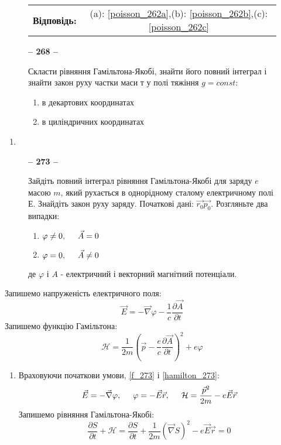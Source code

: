 \documentclass[a4paper,12pt]{article}
\newenvironment{task}[1]{\begin{figure*}[htp]\begin{framed}\begin{center}\textbf{-- {#1} --}\end{center}}{\end{framed}\end{figure*}}
\newenvironment{ans}[0]{\begin{figure*}[htp]\begin{center}\begin{tabular}{lc}\textbf{Відповідь:}\tab&}{\end{tabular}\end{center}\end{figure*}}
\newcommand\partiald[2]{\dfrac{\partial{#1}}{\partial{#2}}}
\newcommand\tab [1][0.5cm]{\hspace*{#1}}
\begin{document}
\begin{justify}
		\begin{ans}
			(a): \cref{poisson_262a},\tab (b): \cref{poisson_262b},\tab (c): \cref{poisson_262c}
		\end{ans}
		\begin{task}{268}
			Скласти рівняння Гамільтона-Якобі, знайти його повний інтеграл і знайти закон руху частки маси т у полі тяжіння $g= const$: 	
			\begin{enumerate}[label=\alph*)]
				\item в декартових координатах
				\item в циліндричних координатах
			\end{enumerate}
		\end{task}
		\begin{enumerate}[label=\alph*)]
			\item 
		\end{enumerate}
		\begin{task}{273}
			Зайдіть повний інтеграл рівняння Гамільтона-Якобі для заряду $e$ масою $m$, який рухається в однорідному сталому електричному полі $Е$. Знайдіть закон руху заряду. Початкові дані: $\vec{r_0}\vec{p_0}$. Розгляньте два випадки:
			\begin{enumerate}[label=\alph*)]
				\item $\varphi\neq0,\tab\vec{A}=0$
				\item $\varphi=0,\tab\vec{A}\neq0$
			\end{enumerate}
			 де $\varphi$ і $A$ - електричний і векторний магнітний потенціали.
		\end{task}
		Запишемо напруженість електричного поля:
		\begin{equation}
			\vec{E}=-\vec{\nabla}\varphi-\dfrac1c\partiald{\vec{A}}{t}
			\label{f_273}
		\end{equation}
		Запишемо функцію Гамільтона:
		\begin{equation}
			\mathcal{H}=\dfrac1{2m}\left(\vec{p}-\dfrac ec\partiald{\vec{A}}{t}\right)^2+e\varphi
			\label{hamilton_273}
		\end{equation}
		\begin{enumerate}[label=\alph*)]
			\item Враховуючи початкови умови, \cref{f_273} і \cref{hamilton_273}:
				$$\vec{E}=-\vec{\nabla}\varphi,\tab\varphi=-\vec{E}\vec{r},\tab \mathcal{H}=\dfrac{\vec{p}^2}{2m}-e\vec{E}\vec{r}$$
				Запишемо рівняння Гамільтона-Якобі:
				\begin{equation}
					\partiald{S}{t}+\mathcal{H}=\partiald{S}{t}+\dfrac{1}{2m}\left(\vec{\nabla}S\right)^2-e\vec{E}\vec{r}=0
				\end{equation}
		\end{enumerate}

		
		
		
		
		
		
		
		
		
		
		
		
		
			
 	\end{justify}
\end{document}
